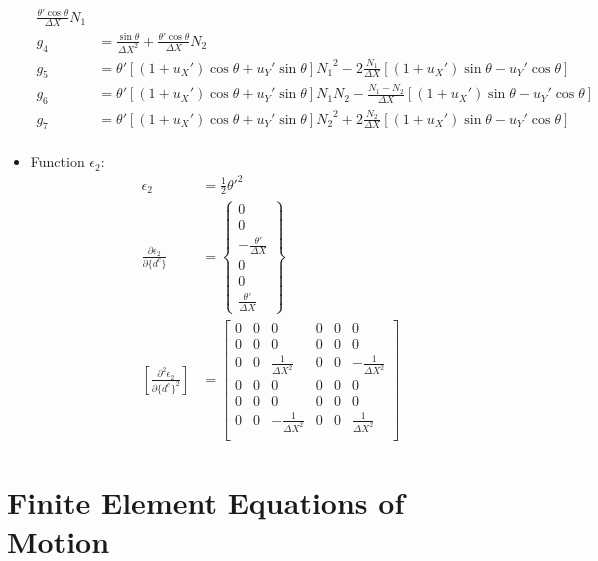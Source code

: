\documentclass[10pt]{article}
\begin{document}
\begin{itemize}
\begin{align}
          \frac{\theta'\cos\theta}{\Delta X}N_1\nonumber\\
    g_4 &= \frac{\sin\theta}{\Delta X^2} +
          \frac{\theta'\cos\theta}{\Delta X}N_2\nonumber\\
    g_5 &= \theta'\left[(1+u_X')\cos\theta +
          u_Y'\sin\theta\right]{N_1}^2 -
          2\frac{N_1}{\Delta X}\left[(1+u_X')\sin\theta -
          u_Y'\cos\theta\right] \nonumber\\
    g_6 &= \theta'\left[(1+u_X')\cos\theta +
          u_Y'\sin\theta\right]N_1N_2 -
          \frac{N_1-N_2}{\Delta X}\left[(1+u_X')\sin\theta -
          u_Y'\cos\theta\right] \nonumber\\
    g_7 &= \theta'\left[(1+u_X')\cos\theta +
          u_Y'\sin\theta\right]{N_2}^2 +
          2\frac{N_2}{\Delta X}\left[(1+u_X')\sin\theta -
          u_Y'\cos\theta\right] \nonumber\\
    \label{eq:e1fs}
  \end{align}
\item Function $\epsilon_2$:
  \begin{align}
    \epsilon_2 &= \frac{1}{2}{\theta'}^2\nonumber\\
    \frac{\partial \epsilon_2}{\partial \{d^e\}} &= \begin{Bmatrix}
      0\\ 0\\ -\frac{\theta'}{\Delta X}\\ 0\\ 0\\
      \frac{\theta'}{\Delta X} \end{Bmatrix}\nonumber\\
    \left[\frac{\partial^2 \epsilon_2}{\partial \{d^e\}^2}\right]
               &= \begin{bmatrix}
                 0&0&0&0&0&0\\
                 0&0&0&0&0&0\\
                 0&0&\frac{1}{\Delta X^2}&0&0&-\frac{1}{\Delta X^2}\\
                 0&0&0&0&0&0\\
                 0&0&0&0&0&0\\
                 0&0&-\frac{1}{\Delta X^2}&0&0&\frac{1}{\Delta X^2}\\
               \end{bmatrix}
    \label{eq:ep2}
  \end{align}
\end{itemize}

\section{Finite Element Equations of Motion}
\label{sec:finite-elem-equat}
\end{document}
